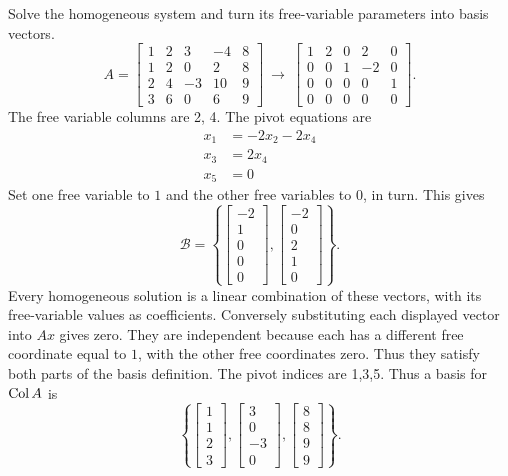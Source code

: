 \goal Solve the homogeneous system and turn its free-variable parameters into basis vectors.
\[A=\left[\begin{array}{rrrrr}1&2&3&-4&8\\1&2&0&2&8\\2&4&-3&10&9\\3&6&0&6&9\end{array}\right]\ \longrightarrow\ \left[\begin{array}{rrrrr}1&2&0&2&0\\0&0&1&-2&0\\0&0&0&0&1\\0&0&0&0&0\end{array}\right].\]
The free variable columns are 2, 4. The pivot equations are
\[\begin{aligned}x_{1}&=- 2 x_{2} - 2 x_{4}\\x_{3}&=2 x_{4}\\x_{5}&=0\end{aligned}\]
Set one free variable to $1$ and the other free variables to $0$, in turn. This gives
\[\mathcal B=\left\{\left[\begin{array}{r}-2\\1\\0\\0\\0\end{array}\right],\left[\begin{array}{r}-2\\0\\2\\1\\0\end{array}\right]\right\}.\]
Every homogeneous solution is a linear combination of these vectors, with its free-variable values as coefficients. Conversely substituting each displayed vector into $Ax$ gives zero. They are independent because each has a different free coordinate equal to $1$, with the other free coordinates zero. Thus they satisfy both parts of the basis definition.
The pivot indices are 1,3,5. Thus a basis for $\operatorname{Col} A$ is\[\left\{\left[\begin{array}{r}1\\1\\2\\3\end{array}\right],\left[\begin{array}{r}3\\0\\-3\\0\end{array}\right],\left[\begin{array}{r}8\\8\\9\\9\end{array}\right]\right\}.\]

